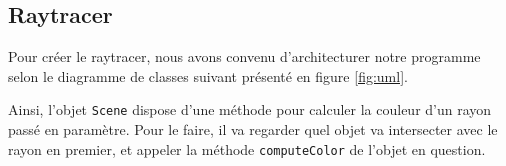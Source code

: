 \documentclass[a4paper]{article}
\begin{document}

  \subsection{Raytracer}
    Pour créer le raytracer, nous avons convenu d'architecturer notre programme
    selon le diagramme de classes suivant présenté en figure \ref{fig:uml}.

    Ainsi, l'objet \verb+Scene+ dispose d'une méthode pour calculer la couleur
    d'un rayon passé en paramètre.
    Pour le faire, il va regarder quel objet va intersecter avec le rayon en
    premier, et appeler la méthode \verb+computeColor+ de l'objet en question.
\end{document}
